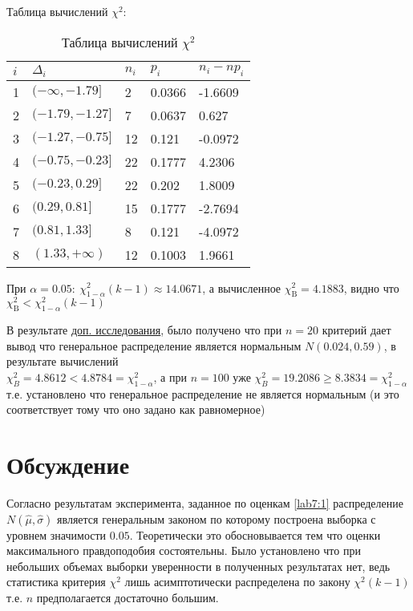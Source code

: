 \documentclass[12pt,a4paper]{article}
\begin{document}
Таблица вычислений $\chi^2$:
\begin{table}[h!]
	\centering
	\begin{tabular}{|l|l|l|l|l|}
		\hline
		$i$&$\Delta_i$		&$n_i$&$p_i$	&$n_i - np_i$  \\ \hline
		1&$(-\infty, -1.79]$&2    &0.0366  	&-1.6609  	\\ \hline
		2&$(-1.79, -1.27]$	&7    &0.0637	&0.627  	\\ \hline
		3&$(-1.27, -0.75]$	&12   &0.121	&-0.0972  	\\ \hline
		4&$(-0.75, -0.23]$	&22   &0.1777	&4.2306  	\\ \hline
		5&$(-0.23, 0.29]$	&22   &0.202	&1.8009    \\ \hline
		6&$(0.29, 0.81]$	&15   &0.1777	&-2.7694	\\ \hline
		7&$(0.81, 1.33]$	&8    &0.121   &-4.0972  	\\ \hline
		8&$(1.33, +\infty)$	&12   &0.1003	&1.9661  	\\ \hline
	\end{tabular}
	\caption{Таблица вычислений $\chi^2$}
\end{table}

При $\alpha = 0.05: \ \chi^2_{1-\alpha}(k-1) \approx 14.0671$, а вычисленное $\chi^2_{\text{B}} = 4.1883$, видно что \\ $\chi^2_{\text{B}} < \chi^2_{1-\alpha}(k-1)$

В результате \hyperref[bonus]{доп. исследования}, было получено что при $n = 20$ критерий дает вывод что генеральное распределение является нормальным $N(0.024, 0.59)$, в результате вычислений \\ $\chi^2_{B} = 4.8612 < 4.8784 = \chi^2_{1-\alpha}$, а при $n = 100$ уже $\chi^2_{B} = 19.2086 \geq 8.3834 = \chi^2_{1-\alpha}$ т.е. установлено что генеральное распределение не является нормальным (и это соответствует тому что оно задано как равномерное)

\pagebreak

\section{Обсуждение}
Согласно результатам эксперимента, заданное по оценкам \eqref{lab7:1} распределение $N(\widehat{\mu}, \widehat{\sigma})$ является генеральным законом по которому построена выборка с уровнем значимости $0.05$. Теоретически это обосновывается тем что оценки максимального правдоподобия состоятельны. Было установлено что при небольших объемах выборки уверенности в полученных результатах нет, ведь статистика критерия $\chi^2$ лишь асимптотически распределена по закону $\chi^2 (k-1)$ т.е. $n$ предполагается достаточно большим.
\pagebreak
\end{document}
